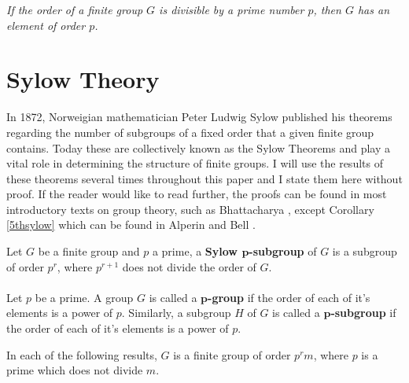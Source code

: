 \begin{theorem}\label{cauchy} \textit{If the order of a finite group $G$ is divisible by a prime number $p$, then $G$ has an element of order $p$.} \\
\end{theorem} 

\section{Sylow Theory}

In 1872, Norweigian mathematician Peter Ludwig Sylow published his theorems regarding the number of subgroups of a fixed order that a given finite group contains. Today these are collectively known as the Sylow Theorems and play a vital role in determining the structure of finite groups. I will use the results of these theorems several times throughout this paper and I state them here without proof. If the reader would like to read further, the proofs can be found in most introductory texts on group theory, such as Bhattacharya \cite{bhattacharya}, except Corollary \ref{5thsylow} which can be found in Alperin and Bell \cite[p.64]{alperin} . \\


\begin{definition}
\leanok 
Let $G$ be a finite group and $p$ a prime, a \textbf{Sylow $\pmb{p}$-subgroup} of $G$ is a subgroup of order $p^r$, where $p^{r+1}$ does not divide the order of $G$. \\
\\
Let $p$ be a prime. A group $G$ is called a \textbf{$\pmb{p}$-group} if the order of each of it's elements is a power of $p$. Similarly, a subgroup $H$ of $G$ is called a \textbf{$\pmb{p}$-subgroup} if the order of each of it's elements is a power of $p$.
\end{definition}

In each of the following results, $G$ is a finite group of order $p^r m$, where $p$ is a prime which does not divide $m$. \\
\\

\begin{theorem}
\leanok
{} \\

\end{theorem}

